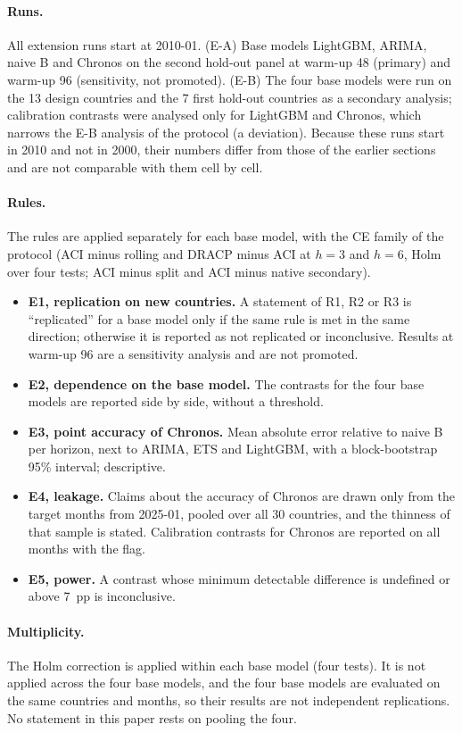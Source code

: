 \paragraph{Runs.} All extension runs start at 2010-01. (E-A) Base models LightGBM, ARIMA, naive B and Chronos on the second hold-out panel at warm-up 48 (primary) and warm-up 96 (sensitivity, not promoted). (E-B) The four base models were run on the 13 design countries and the 7 first hold-out countries as a secondary analysis; calibration contrasts were analysed only for LightGBM and Chronos, which narrows the E-B analysis of the protocol (a deviation). Because these runs start in 2010 and not in 2000, their numbers differ from those of the earlier sections and are not comparable with them cell by cell.

\paragraph{Rules.} The rules are applied separately for each base model, with the CE family of the protocol (ACI minus rolling and DRACP minus ACI at $h=3$ and $h=6$, Holm over four tests; ACI minus split and ACI minus native secondary).
\begin{itemize}
\item \textbf{E1, replication on new countries.} A statement of R1, R2 or R3 is ``replicated'' for a base model only if the same rule is met in the same direction; otherwise it is reported as not replicated or inconclusive. Results at warm-up 96 are a sensitivity analysis and are not promoted.
\item \textbf{E2, dependence on the base model.} The contrasts for the four base models are reported side by side, without a threshold.
\item \textbf{E3, point accuracy of Chronos.} Mean absolute error relative to naive B per horizon, next to ARIMA, ETS and LightGBM, with a block-bootstrap 95\% interval; descriptive.
\item \textbf{E4, leakage.} Claims about the accuracy of Chronos are drawn only from the target months from 2025-01, pooled over all 30 countries, and the thinness of that sample is stated. Calibration contrasts for Chronos are reported on all months with the flag.
\item \textbf{E5, power.} A contrast whose minimum detectable difference is undefined or above 7~pp is inconclusive.
\end{itemize}

\paragraph{Multiplicity.} The Holm correction is applied within each base model (four tests). It is not applied across the four base models, and the four base models are evaluated on the same countries and months, so their results are not independent replications. No statement in this paper rests on pooling the four.

